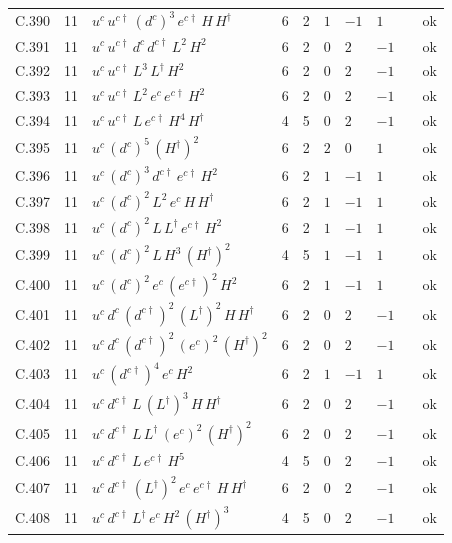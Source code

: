 {\begin{longtable}{@{}ll>{\raggedright\arraybackslash}p{6.4cm}rrllllr@{}}
C.390 & 11 & $u^c\,u^{c\dagger}\,(d^c)^{3}\,e^{c\dagger}\,H\,H^\dagger$ & 6 & 2 & $1$ & $-1$ & $1$ &  & ok \\
C.391 & 11 & $u^c\,u^{c\dagger}\,d^c\,d^{c\dagger}\,L^{2}\,H^{2}$ & 6 & 2 & $0$ & $2$ & $-1$ &  & ok \\
C.392 & 11 & $u^c\,u^{c\dagger}\,L^{3}\,L^\dagger\,H^{2}$ & 6 & 2 & $0$ & $2$ & $-1$ &  & ok \\
C.393 & 11 & $u^c\,u^{c\dagger}\,L^{2}\,e^c\,e^{c\dagger}\,H^{2}$ & 6 & 2 & $0$ & $2$ & $-1$ &  & ok \\
C.394 & 11 & $u^c\,u^{c\dagger}\,L\,e^{c\dagger}\,H^{4}\,H^\dagger$ & 4 & 5 & $0$ & $2$ & $-1$ &  & ok \\
C.395 & 11 & $u^c\,(d^c)^{5}\,(H^\dagger)^{2}$ & 6 & 2 & $2$ & $0$ & $1$ &  & ok \\
C.396 & 11 & $u^c\,(d^c)^{3}\,d^{c\dagger}\,e^{c\dagger}\,H^{2}$ & 6 & 2 & $1$ & $-1$ & $1$ &  & ok \\
C.397 & 11 & $u^c\,(d^c)^{2}\,L^{2}\,e^c\,H\,H^\dagger$ & 6 & 2 & $1$ & $-1$ & $1$ &  & ok \\
C.398 & 11 & $u^c\,(d^c)^{2}\,L\,L^\dagger\,e^{c\dagger}\,H^{2}$ & 6 & 2 & $1$ & $-1$ & $1$ &  & ok \\
C.399 & 11 & $u^c\,(d^c)^{2}\,L\,H^{3}\,(H^\dagger)^{2}$ & 4 & 5 & $1$ & $-1$ & $1$ &  & ok \\
C.400 & 11 & $u^c\,(d^c)^{2}\,e^c\,(e^{c\dagger})^{2}\,H^{2}$ & 6 & 2 & $1$ & $-1$ & $1$ &  & ok \\
C.401 & 11 & $u^c\,d^c\,(d^{c\dagger})^{2}\,(L^\dagger)^{2}\,H\,H^\dagger$ & 6 & 2 & $0$ & $2$ & $-1$ &  & ok \\
C.402 & 11 & $u^c\,d^c\,(d^{c\dagger})^{2}\,(e^c)^{2}\,(H^\dagger)^{2}$ & 6 & 2 & $0$ & $2$ & $-1$ &  & ok \\
C.403 & 11 & $u^c\,(d^{c\dagger})^{4}\,e^c\,H^{2}$ & 6 & 2 & $1$ & $-1$ & $1$ &  & ok \\
C.404 & 11 & $u^c\,d^{c\dagger}\,L\,(L^\dagger)^{3}\,H\,H^\dagger$ & 6 & 2 & $0$ & $2$ & $-1$ &  & ok \\
C.405 & 11 & $u^c\,d^{c\dagger}\,L\,L^\dagger\,(e^c)^{2}\,(H^\dagger)^{2}$ & 6 & 2 & $0$ & $2$ & $-1$ &  & ok \\
C.406 & 11 & $u^c\,d^{c\dagger}\,L\,e^{c\dagger}\,H^{5}$ & 4 & 5 & $0$ & $2$ & $-1$ &  & ok \\
C.407 & 11 & $u^c\,d^{c\dagger}\,(L^\dagger)^{2}\,e^c\,e^{c\dagger}\,H\,H^\dagger$ & 6 & 2 & $0$ & $2$ & $-1$ &  & ok \\
C.408 & 11 & $u^c\,d^{c\dagger}\,L^\dagger\,e^c\,H^{2}\,(H^\dagger)^{3}$ & 4 & 5 & $0$ & $2$ & $-1$ &  & ok \\

\end{longtable}}
